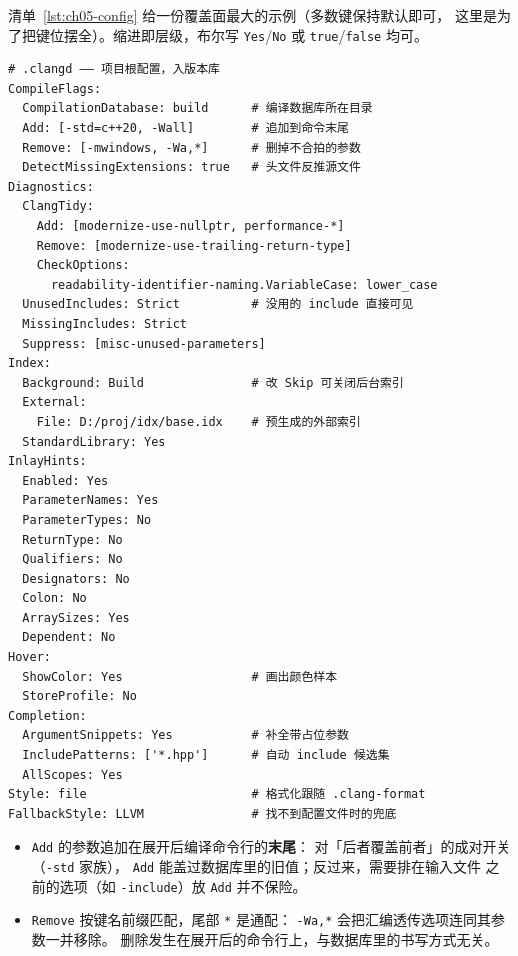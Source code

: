 \documentclass[12pt,a4paper,fontset=fandol]{ctexbook}
\newcommand{\Bk}{\discretionary{}{}{}}
\begin{document}
清单~\ref{lst:ch05-config} 给一份覆盖面最大的示例（多数键保持默认即可，
这里是为了把键位摆全）。缩进即层级，布尔写 \texttt{Yes}/{\Bk}\texttt{No}
或 \texttt{true}/{\Bk}\texttt{false} 均可。

\begin{lstlisting}[style=yamlstyle,caption={\texttt{.clangd} 全键位示例（覆盖面优先，非推荐组合）},label={lst:ch05-config}]
# .clangd —— 项目根配置，入版本库
CompileFlags:
  CompilationDatabase: build      # 编译数据库所在目录
  Add: [-std=c++20, -Wall]        # 追加到命令末尾
  Remove: [-mwindows, -Wa,*]      # 删掉不合拍的参数
  DetectMissingExtensions: true   # 头文件反推源文件
Diagnostics:
  ClangTidy:
    Add: [modernize-use-nullptr, performance-*]
    Remove: [modernize-use-trailing-return-type]
    CheckOptions:
      readability-identifier-naming.VariableCase: lower_case
  UnusedIncludes: Strict          # 没用的 include 直接可见
  MissingIncludes: Strict
  Suppress: [misc-unused-parameters]
Index:
  Background: Build               # 改 Skip 可关闭后台索引
  External:
    File: D:/proj/idx/base.idx    # 预生成的外部索引
  StandardLibrary: Yes
InlayHints:
  Enabled: Yes
  ParameterNames: Yes
  ParameterTypes: No
  ReturnType: No
  Qualifiers: No
  Designators: No
  Colon: No
  ArraySizes: Yes
  Dependent: No
Hover:
  ShowColor: Yes                  # 画出颜色样本
  StoreProfile: No
Completion:
  ArgumentSnippets: Yes           # 补全带占位参数
  IncludePatterns: ['*.hpp']      # 自动 include 候选集
  AllScopes: Yes
Style: file                       # 格式化跟随 .clang-format
FallbackStyle: LLVM               # 找不到配置文件时的兜底
\end{lstlisting}

\begin{note}[title={Add 追加在末尾，Remove 支持通配}]
\begin{itemize}
  \item \texttt{Add} 的参数追加在展开后编译命令行的\textbf{末尾}：
        对「后者覆盖前者」的成对开关（\texttt{-std} 家族），
        \texttt{Add} 能盖过数据库里的旧值；反过来，需要排在输入文件
        之前的选项（如 \texttt{-include}）放 \texttt{Add} 并不保险。
  \item \texttt{Remove} 按键名前缀匹配，尾部 \texttt{*} 是通配：
        \texttt{-Wa,*} 会把汇编透传选项连同其参数一并移除。
        删除发生在展开后的命令行上，与数据库里的书写方式无关。
\end{itemize}
\end{note}

\end{document}
